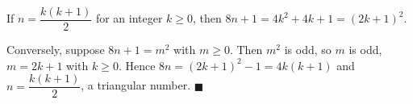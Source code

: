 If $n=\dfrac{k(k+1)}{2}$ for an integer $k\ge0$, then $8n+1=4k^2+4k+1=(2k+1)^2$.

Conversely, suppose $8n+1=m^2$ with $m\ge0$. Then $m^2$ is odd, so $m$ is odd, $m=2k+1$ with $k\ge0$. Hence $8n=(2k+1)^2-1=4k(k+1)$ and $n=\dfrac{k(k+1)}{2}$, a triangular number. $\blacksquare$
